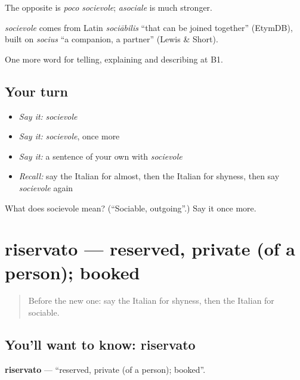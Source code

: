 The opposite is \emph{poco socievole}; \emph{asociale} is much stronger.

\begin{cousinweb}
\emph{socievole} comes from Latin \emph{sociābilis} \textquotedblleft{}that can be joined together\textquotedblright{} (EtymDB), built on \emph{socius} \textquotedblleft{}a companion, a partner\textquotedblright{} (Lewis \& Short).
\end{cousinweb}

\begin{grammarlens}[title={What you've built}]
One more word for telling, explaining and describing at B1.
\end{grammarlens}

\subsection*{Your turn}
\begin{itemize}
\raggedright
  \item \emph{Say it:} \emph{socievole}
  \item \emph{Say it:} \emph{socievole}, once more
  \item \emph{Say it:} a sentence of your own with \emph{socievole}
  \item \emph{Recall:} say the Italian for almost, then the Italian for shyness, then say \emph{socievole} again
\end{itemize}

\begin{tcolorbox}[breakable,colback=teal!4,colframe=teal!35!black,title={Before you move on}]
What does socievole mean? (\textquotedblleft{}Sociable, outgoing\textquotedblright{}.) Say it once more.
\end{tcolorbox}
\section[riservato]{riservato — reserved, private (of a person); booked}

\label{lesson:IT-C471-riservato}



\begin{quote}
Before the new one: say the Italian for shyness, then the Italian for sociable.
\end{quote}

\subsection*{You'll want to know: riservato}
\textbf{riservato} — \textquotedblleft{}reserved, private (of a person); booked\textquotedblright{}.


